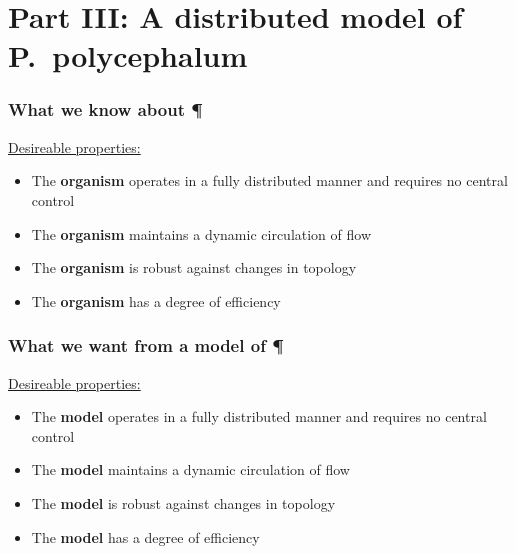 \documentclass[	hyperref={pdfpagelabels=false}, xcolor=dvipsnames,
		11pt]{beamer}
\begin{document}


\section{Part III: A distributed model of P.~polycephalum} 

\begin{frame}
    \frametitle{What we know about \P} 

	\begin{block}{\underline{Desireable properties:}}
	 \begin{itemize}
	 	\item The \textbf{organism} operates in a fully distributed manner and requires no central control
		\item The \textbf{organism} maintains a dynamic circulation of flow
		\item The \textbf{organism} is robust against changes in topology
		\item The \textbf{organism} has a degree of efficiency
	 \end{itemize}
	\end{block}
\end{frame}

\begin{frame}
    \frametitle{What we want from a model of \P} 

	\begin{block}{\underline{Desireable properties:}}
	 \begin{itemize}
	 	\item The \textbf{model} operates in a fully distributed manner and requires no central control
		\item The \textbf{model} maintains a dynamic circulation of flow
		\item The \textbf{model} is robust against changes in topology
		\item The \textbf{model} has a degree of efficiency
	 \end{itemize}
	\end{block}
\end{frame}
\end{document}
